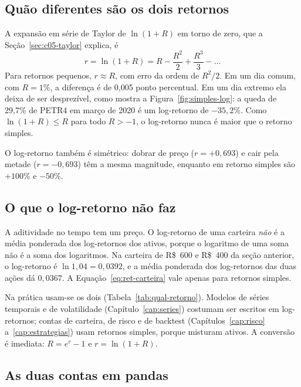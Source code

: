 \subsection{Quão diferentes são os dois retornos}

A expansão em série de Taylor de $\ln(1+R)$ em torno de zero, que a Seção~\ref{sec:c05-taylor} explica, é
\begin{equation}
  r = \ln(1+R) = R - \frac{R^2}{2} + \frac{R^3}{3} - \dots
\end{equation}
Para retornos pequenos, $r \approx R$, com erro da ordem de $R^2/2$. Em um dia comum, com $R = 1\%$, a diferença é de 0,005 ponto percentual. Em um dia extremo ela deixa de ser desprezível, como mostra a Figura~\ref{fig:simples-log}: a queda de 29,7\% de PETR4 em março de 2020 é um log-retorno de $-35,2\%$. Como $\ln(1+R) \le R$ para todo $R > -1$, o log-retorno nunca é maior que o retorno simples.


O log-retorno também é simétrico: dobrar de preço ($r = +0,693$) e cair pela metade ($r = -0,693$) têm a mesma magnitude, enquanto em retorno simples são $+100\%$ e $-50\%$.

\subsection{O que o log-retorno não faz}

A aditividade no tempo tem um preço. O log-retorno de uma carteira \emph{não} é a média ponderada dos log-retornos dos ativos, porque o logaritmo de uma soma não é a soma dos logaritmos. Na carteira de R\$~600 e R\$~400 da seção anterior, o log-retorno é $\ln 1,04 = 0,0392$, e a média ponderada dos log-retornos das duas ações dá $0,0367$. A Equação~\eqref{eq:ret-carteira} vale apenas para retornos simples.

Na prática usam-se os dois (Tabela~\ref{tab:qual-retorno}). Modelos de séries temporais e de volatilidade (Capítulo~\ref{cap:series}) costumam ser escritos em log-retornos; contas de carteira, de risco e de backtest (Capítulos~\ref{cap:risco} a~\ref{cap:estrategias}) usam retornos simples, porque misturam ativos. A conversão é imediata: $R = e^{r} - 1$ e $r = \ln(1+R)$.

\subsection{As duas contas em pandas}

